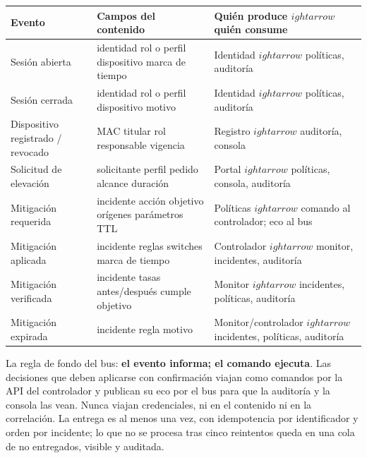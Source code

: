 \documentclass[11pt,a4paper]{article}
\begin{document}
\begin{longtable}{p{4.2cm}p{5.2cm}p{4.6cm}}
\toprule
\textbf{Evento} & \textbf{Campos del contenido} & \textbf{Quién produce $
ightarrow$ quién consume}\\
\midrule
Sesión abierta & identidad \textperiodcentered{} rol o perfil \textperiodcentered{} dispositivo \textperiodcentered{} marca de tiempo & Identidad $
ightarrow$ políticas, auditoría\\
Sesión cerrada & identidad \textperiodcentered{} rol o perfil \textperiodcentered{} dispositivo \textperiodcentered{} motivo & Identidad $
ightarrow$ políticas, auditoría\\
Dispositivo registrado / revocado & MAC \textperiodcentered{} titular \textperiodcentered{} rol \textperiodcentered{} responsable \textperiodcentered{} vigencia & Registro $
ightarrow$ auditoría, consola\\
Solicitud de elevación & solicitante \textperiodcentered{} perfil pedido \textperiodcentered{} alcance \textperiodcentered{} duración & Portal $
ightarrow$ políticas, consola, auditoría\\
Mitigación requerida & incidente \textperiodcentered{} acción \textperiodcentered{} objetivo \textperiodcentered{} orígenes \textperiodcentered{} parámetros \textperiodcentered{} TTL & Políticas $
ightarrow$ comando al controlador; eco al bus\\
Mitigación aplicada & incidente \textperiodcentered{} reglas \textperiodcentered{} switches \textperiodcentered{} marca de tiempo & Controlador $
ightarrow$ monitor, incidentes, auditoría\\
Mitigación verificada & incidente \textperiodcentered{} tasas antes/después \textperiodcentered{} cumple objetivo & Monitor $
ightarrow$ incidentes, políticas, auditoría\\
Mitigación expirada & incidente \textperiodcentered{} regla \textperiodcentered{} motivo & Monitor/controlador $
ightarrow$ incidentes, políticas, auditoría\\
\bottomrule
\end{longtable}

La regla de fondo del bus: \textbf{el evento informa; el comando ejecuta}. Las decisiones que deben aplicarse con confirmación viajan como comandos por la API del controlador y publican su eco por el bus para que la auditoría y la consola las vean. Nunca viajan credenciales, ni en el contenido ni en la correlación. La entrega es al menos una vez, con idempotencia por identificador y orden por incidente; lo que no se procesa tras cinco reintentos queda en una cola de no entregados, visible y auditada.
\end{document}

